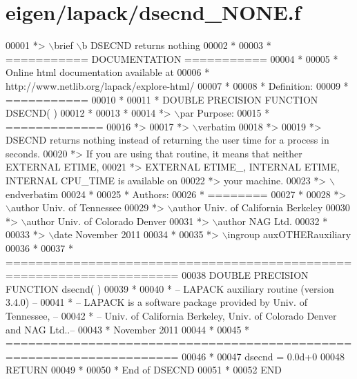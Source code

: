 \hypertarget{eigen_2lapack_2dsecnd___n_o_n_e_8f_source}{}\section{eigen/lapack/dsecnd\+\_\+\+N\+O\+NE.f}
\label{eigen_2lapack_2dsecnd___n_o_n_e_8f_source}

\begin{DoxyCode}
00001 \textcolor{comment}{*> \(\backslash\)brief \(\backslash\)b DSECND returns nothing}
00002 \textcolor{comment}{*}
00003 \textcolor{comment}{*  =========== DOCUMENTATION ===========}
00004 \textcolor{comment}{*}
00005 \textcolor{comment}{* Online html documentation available at }
00006 \textcolor{comment}{*            http://www.netlib.org/lapack/explore-html/ }
00007 \textcolor{comment}{*}
00008 \textcolor{comment}{*  Definition:}
00009 \textcolor{comment}{*  ===========}
00010 \textcolor{comment}{*}
00011 \textcolor{comment}{*      DOUBLE PRECISION FUNCTION DSECND( )}
00012 \textcolor{comment}{*  }
00013 \textcolor{comment}{*}
00014 \textcolor{comment}{*> \(\backslash\)par Purpose:}
00015 \textcolor{comment}{*  =============}
00016 \textcolor{comment}{*>}
00017 \textcolor{comment}{*> \(\backslash\)verbatim}
00018 \textcolor{comment}{*>}
00019 \textcolor{comment}{*>  DSECND returns nothing instead of returning the user time for a process in seconds.}
00020 \textcolor{comment}{*>  If you are using that routine, it means that neither EXTERNAL ETIME,}
00021 \textcolor{comment}{*>  EXTERNAL ETIME\_, INTERNAL ETIME, INTERNAL CPU\_TIME is available  on}
00022 \textcolor{comment}{*>  your machine.}
00023 \textcolor{comment}{*> \(\backslash\)endverbatim}
00024 \textcolor{comment}{*}
00025 \textcolor{comment}{*  Authors:}
00026 \textcolor{comment}{*  ========}
00027 \textcolor{comment}{*}
00028 \textcolor{comment}{*> \(\backslash\)author Univ. of Tennessee }
00029 \textcolor{comment}{*> \(\backslash\)author Univ. of California Berkeley }
00030 \textcolor{comment}{*> \(\backslash\)author Univ. of Colorado Denver }
00031 \textcolor{comment}{*> \(\backslash\)author NAG Ltd. }
00032 \textcolor{comment}{*}
00033 \textcolor{comment}{*> \(\backslash\)date November 2011}
00034 \textcolor{comment}{*}
00035 \textcolor{comment}{*> \(\backslash\)ingroup auxOTHERauxiliary}
00036 \textcolor{comment}{*}
00037 \textcolor{comment}{*  =====================================================================}
00038 \textcolor{keyword}{      DOUBLE PRECISION }\textcolor{keyword}{FUNCTION }dsecnd( )
00039 \textcolor{comment}{*}
00040 \textcolor{comment}{*  -- LAPACK auxiliary routine (version 3.4.0) --}
00041 \textcolor{comment}{*  -- LAPACK is a software package provided by Univ. of Tennessee,    --}
00042 \textcolor{comment}{*  -- Univ. of California Berkeley, Univ. of Colorado Denver and NAG Ltd..--}
00043 \textcolor{comment}{*     November 2011}
00044 \textcolor{comment}{*}
00045 \textcolor{comment}{* =====================================================================}
00046 \textcolor{comment}{*}
00047       dsecnd = 0.0d+0
00048       \textcolor{keywordflow}{RETURN}
00049 \textcolor{comment}{*}
00050 \textcolor{comment}{*     End of DSECND}
00051 \textcolor{comment}{*}
00052 \textcolor{keyword}{      END}
\end{DoxyCode}
